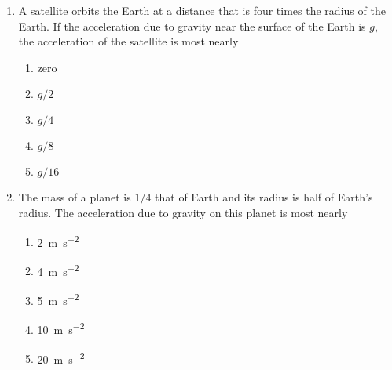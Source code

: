 \documentclass{../../../oss-apphys}
\begin{document}
\begin{multicols}{2}
\begin{enumerate}[leftmargin=18pt]
  \item A satellite orbits the Earth at a distance that is four times the radius
    of the Earth. If the acceleration due to gravity near the surface of the
    Earth is $g$, the acceleration of the satellite is most nearly
    \begin{enumerate}[noitemsep,topsep=0pt,leftmargin=18pt,label=(\Alph*)]
    \item zero
    \item $g/2$
    \item $g/4$
    \item $g/8$
    \item $g/16$
    \end{enumerate}

  \item The mass of a planet is $1/4$ that of Earth and its radius is half of
    Earth's radius. The acceleration due to gravity on this planet is most
    nearly
    \begin{enumerate}[noitemsep,topsep=0pt,leftmargin=18pt,label=(\Alph*)]
    \item\SI{2 }{\metre\per\second^2}
    \item\SI{4 }{\metre\per\second^2}
    \item\SI{5 }{\metre\per\second^2}
    \item\SI{10}{\metre\per\second^2}
    \item\SI{20}{\metre\per\second^2}
    \end{enumerate}
  
%  
    \columnbreak
    

\end{enumerate}
\end{multicols}
\end{document}
